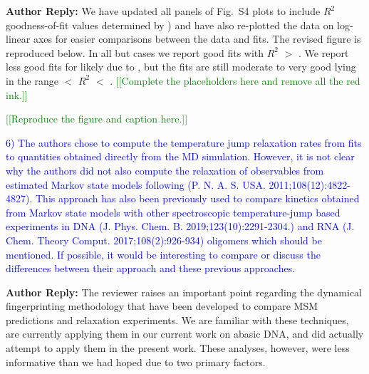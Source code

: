 \documentclass[11pt,a4paper]{letter} %
\newcommand*{\rood}[1]{{\color{red}{#1}}}
\newcommand*{\noteg}[1]{\textcolor{green}{[[#1]]}}		%
\newcommand*{\noter}[1]{{\color{red}{[[#1]]}}}
\begin{document}
\textbf{Author Reply:}     We have updated all panels of Fig.~S4 plots to include $R^2$ goodness-of-fit values determined by \rood{linear least squares fits of the models in log-space (i.e., $\log \left( f \right) = -k_d t$}) and have also re-plotted the data on log-linear axes for easier comparisons between the data and fits. The revised figure is reproduced below. In all but \rood{XX} cases we report good fits with $R^2$ $>$ \rood{0.88}. We report less good fits for \noter{which systems} likely due to \noter{why? sparser data?}, but the fits are still moderate to very good lying in the range \rood{X.XX} $<$ $R^2$ $<$ \rood{X.XX}. \noteg{Complete the placeholders here and remove all the red ink.}

\noteg{Reproduce the figure and caption here.}






\textcolor{blue}{6)       The authors chose to compute the temperature jump relaxation rates from fits to quantities obtained directly from the MD simulation. However, it is not clear why the authors did not also compute the relaxation of observables from estimated Markov state models following (P. N. A. S. USA. 2011;108(12):4822-4827). This approach has also been previously used to compare kinetics obtained from Markov state models with other spectroscopic temperature-jump based experiments in DNA (J. Phys. Chem. B. 2019;123(10):2291-2304.) and RNA (J. Chem. Theory Comput. 2017;108(2):926-934) oligomers which should be mentioned. If possible, it would be interesting to compare or discuss the differences between their approach and these previous approaches.}

\textbf{Author Reply:}  The reviewer raises an important point regarding the dynamical fingerprinting methodology that have been developed to compare MSM predictions and relaxation experiments. We are familiar with these techniques, are currently applying them in our current work on abasic DNA, and did actually attempt to apply them in the present work. These analyses, however, were less informative than we had hoped due to two primary factors. 
\end{document}

